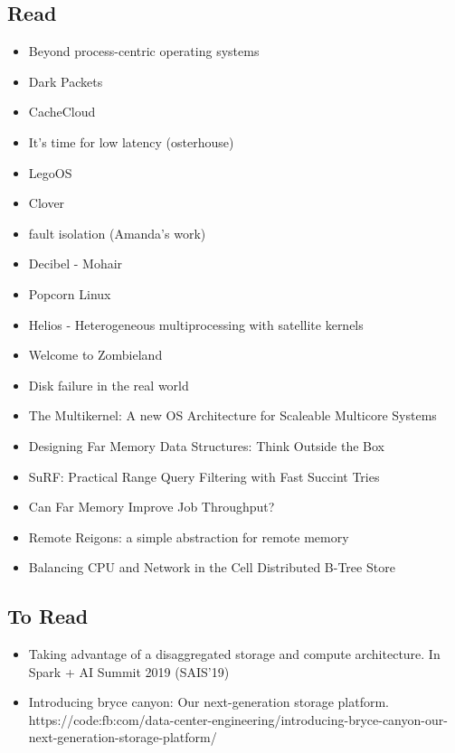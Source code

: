 \subsection{Read}
\begin{itemize}
    \item{Beyond process-centric operating systems}~\cite{189914}\rpaper{}
    \item{Dark Packets}\rabstract{}
    \item{CacheCloud}~\cite{cachecloud}\rintro{+}
    \item{It's time for low latency (osterhouse)}
    \item{LegoOS}\cite{legoos}\rpaper{}
    \item {Clover}\cite{clover}\rpaper{}
    \item{fault isolation (Amanda's work)}\rintro{}
    \item{Decibel - Mohair}\rabstract{}
    \item{Popcorn Linux}
    \item{Helios - Heterogeneous multiprocessing with satellite kernels}~\cite{helios}\rabstract{}
    \item{Welcome to Zombieland}~\cite{zombieland}\rintro{}
    \item{Disk failure in the real world}~\cite{Schroeder:2007:DFR:1267903.1267904}\rabstract{}
    \item{The Multikernel: A new OS Architecture for Scaleable Multicore Systems}~\cite{the-multikenel}\rabstract{}
    \item{Designing Far Memory Data Structures: Think Outside the Box}~\cite{aguilera2019designing}
    \item{SuRF: Practical Range Query Filtering with Fast Succint Tries}~\cite{surf}\rabstract{}
    \item{Can Far Memory Improve Job Throughput?}~\cite{10.1145/3342195.3387522}
    \item{Remote Reigons: a simple abstraction for remote memory}~\cite{215933}
    \item{Balancing CPU and Network in the Cell Distributed B-Tree Store}~\cite{cell}

\end{itemize}

\subsection{To Read}
\begin{itemize}
    \item{Taking advantage of a disaggregated storage and compute architecture. In Spark + AI Summit 2019 (SAIS'19)}
    \item{Introducing bryce canyon: Our next-generation storage platform. https://code:fb:com/data-center-engineering/introducing-bryce-canyon-our-next-generation-storage-platform/ }

\end{itemize}


